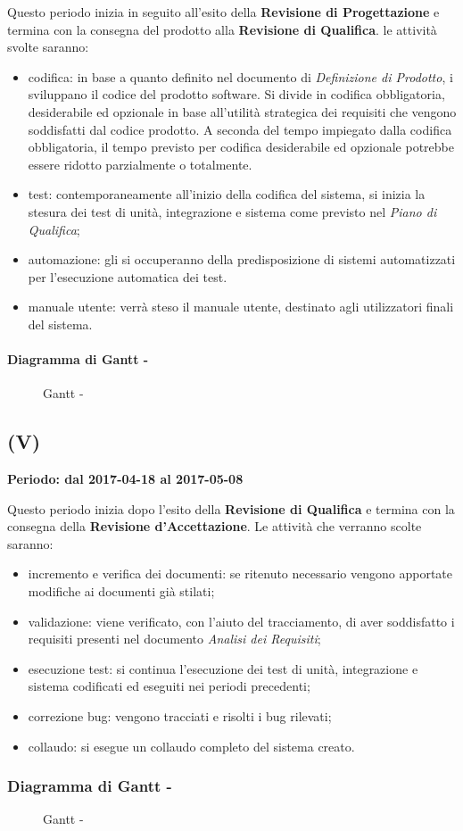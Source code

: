 \documentclass[./PianoDiProgetto.tex]{subfiles}
\begin{document}
  Questo periodo inizia in seguito all'esito della \textbf{Revisione di Progettazione} e termina con la consegna del prodotto alla \textbf{Revisione di Qualifica}. le attività svolte saranno:
  \begin{itemize}
    \item codifica: in base a quanto definito nel documento di \textit{Definizione di Prodotto}, i \PRP{} sviluppano il codice del prodotto software. Si divide in codifica obbligatoria, desiderabile ed opzionale in base all'utilità strategica dei requisiti che vengono soddisfatti dal codice prodotto. A seconda del tempo impiegato dalla codifica obbligatoria, il tempo previsto per codifica desiderabile ed opzionale potrebbe essere ridotto parzialmente o totalmente.
    \item test: contemporaneamente all'inizio della codifica del sistema, si inizia la stesura dei test di unità, integrazione e sistema come previsto nel \textit{Piano di Qualifica};
    \item automazione: gli \AMMP{} si occuperanno della predisposizione di sistemi automatizzati per l'esecuzione automatica dei test.
    \item manuale utente: verrà steso il manuale utente, destinato agli utilizzatori finali del sistema.
  \end{itemize}

  \paragraph{Diagramma di Gantt - \PerC}
    \begin{figure}[!h]
    \centering
    \caption{Gantt - \PerC}
    \end{figure}

  \subsection{\PerV (V)}
  \textbf{Periodo: dal 2017-04-18 al 2017-05-08}

  Questo periodo inizia dopo l'esito della \textbf{Revisione di Qualifica} e termina con la consegna della \textbf{Revisione d'Accettazione}. Le attività che verranno scolte saranno:
  \begin{itemize}
    \item incremento e verifica dei documenti: se ritenuto necessario vengono apportate modifiche ai documenti già stilati;
    \item validazione: viene verificato, con l'aiuto del tracciamento, di aver soddisfatto i requisiti presenti nel documento \textit{Analisi dei Requisiti};
    \item esecuzione test: si continua l'esecuzione dei test di unità, integrazione e sistema codificati ed eseguiti nei periodi precedenti;
    \item correzione bug: vengono tracciati e risolti i bug rilevati;
    \item collaudo: si esegue un collaudo completo del sistema creato.
  \end{itemize}

  \subsubsection{Diagramma di Gantt - \PerV}
    \begin{figure}[!h]
    \centering
    \caption{Gantt - \PerV}
    \end{figure}
\end{document}

